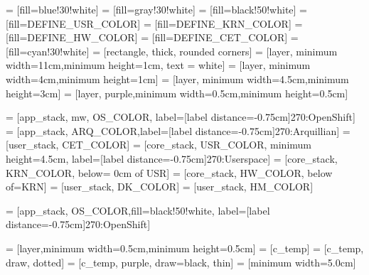   = [fill=blue!30!white]
 = [fill=gray!30!white]
  = [fill=black!50!white]
 = [fill=DEFINE_USR_COLOR]
 = [fill=DEFINE_KRN_COLOR]
  = [fill=DEFINE_HW_COLOR]
 = [fill=DEFINE_CET_COLOR]
  = [fill=cyan!30!white]
      = [rectangle, thick, rounded corners]
 = [layer, minimum width=11cm,minimum height=1cm, text = white]
 = [layer, minimum width=4cm,minimum height=1cm]
  = [layer, minimum width=4.5cm,minimum height=3cm]
  = [layer, purple,minimum width=0.5cm,minimum height=0.5cm]

  = [app_stack, mw, OS_COLOR, label={[label distance=-0.75cm]270:OpenShift}]
 = [app_stack, ARQ_COLOR,label={[label distance=-0.75cm]270:Arquillian}]
 = [user_stack, CET_COLOR]
 = [core_stack, USR_COLOR, minimum height=4.5cm, label={[label distance=-0.75cm]270:\color{white}Userspace}]
 = [core_stack, KRN_COLOR, below= 0cm of USR]
  = [core_stack, HW_COLOR, below of=KRN]
  = [user_stack, DK_COLOR]
  = [user_stack, HM_COLOR]

 = [app_stack, OS_COLOR,fill=black!50!white, label={[label distance=-0.75cm]270:OpenShift}]


 = [layer,minimum width=0.5cm,minimum height=0.5cm]
 = [c_temp]
 = [c_temp, draw, dotted]
 = [c_temp, purple, draw=black, thin]
     = [minimum width=5.0cm]


